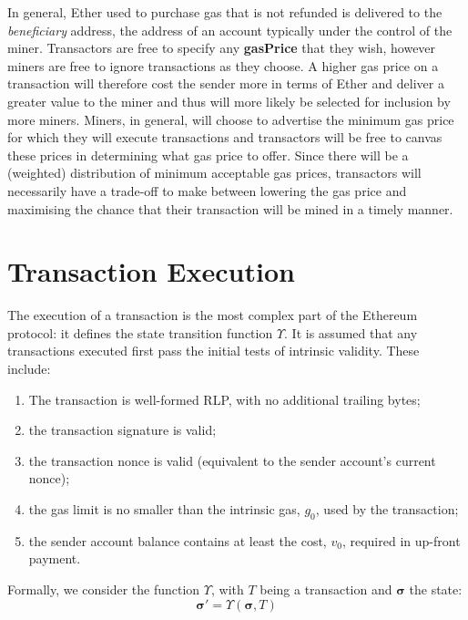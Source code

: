 \documentclass[9pt,oneside]{amsart}
\begin{document}
\begin{multicols}{2}
In general, Ether used to purchase gas that is not refunded is delivered to the \textit{beneficiary} address, the address of an account typically under the control of the miner. Transactors are free to specify any \textbf{gasPrice} that they wish, however miners are free to ignore transactions as they choose. A higher gas price on a transaction will therefore cost the sender more in terms of Ether and deliver a greater value to the miner and thus will more likely be selected for inclusion by more miners. Miners, in general, will choose to advertise the minimum gas price for which they will execute transactions and transactors will be free to canvas these prices in determining what gas price to offer. Since there will be a (weighted) distribution of minimum acceptable gas prices, transactors will necessarily have a trade-off to make between lowering the gas price and maximising the chance that their transaction will be mined in a timely manner.


\section{Transaction Execution} \label{ch:transactions}

The execution of a transaction is the most complex part of the Ethereum protocol: it defines the state transition function $\Upsilon$. It is assumed that any transactions executed first pass the initial tests of intrinsic validity. These include:

\begin{enumerate}
\item The transaction is well-formed RLP, with no additional trailing bytes;
\item the transaction signature is valid;
\item the transaction nonce is valid (equivalent to the sender account's current nonce);
\item the gas limit is no smaller than the intrinsic gas, $g_0$, used by the transaction;
\item the sender account balance contains at least the cost, $v_0$, required in up-front payment.
\end{enumerate}

Formally, we consider the function $\Upsilon$, with $T$ being a transaction and $\boldsymbol{\sigma}$ the state:
\begin{equation}
\boldsymbol{\sigma}' = \Upsilon(\boldsymbol{\sigma}, T)
\end{equation}


\end{multicols}
\end{document}
